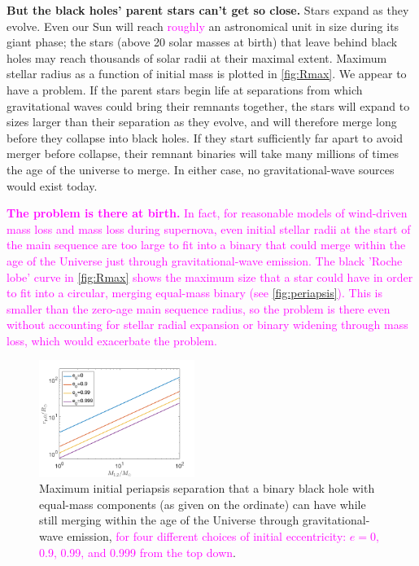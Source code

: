 \documentclass[iop,onecolumn]{revtex4}
\newcommand{\ilya}[1]{\textcolor{magenta}{#1}}
\begin{document}
\textbf{But the black holes' parent stars can't get so close.} Stars expand as they evolve. Even our Sun will reach \ilya{roughly} an astronomical unit in size during its giant phase; the stars (above 20 solar masses at birth) that leave behind black holes may reach thousands of solar radii at their maximal extent. Maximum stellar radius as a function of initial mass is plotted in \autoref{fig:Rmax}. We appear to have a problem. If the parent stars begin life at separations from which gravitational waves could bring their remnants together, the stars will expand to sizes larger than their separation as they evolve, and will therefore merge long before they collapse into black holes. If they start sufficiently far apart to avoid merger before collapse, their remnant binaries will take many millions of times the age of the universe to merge. In either case, no gravitational-wave sources would exist today. 

\ilya{\textbf{The problem is there at birth.} In fact, for reasonable models of wind-driven mass loss and mass loss during supernova, even initial stellar radii at the start of the main sequence are too large to fit into a binary that could merge within the age of the Universe just through gravitational-wave emission.  The black 'Roche lobe' curve in \autoref{fig:Rmax} shows the maximum size that a star could have in order to fit into a circular, merging equal-mass binary (see \autoref{fig:periapsis}).  This is smaller than the zero-age main sequence radius, so the problem is there even without accounting for stellar radial expansion or binary widening through mass loss, which would exacerbate the problem.}

 
\begin{figure}
	\centering
	\includegraphics[width=0.45\textwidth]{M-rp-log.png}
	\caption{Maximum initial periapsis separation that a binary black hole with equal-mass components (as given on the ordinate) can have while still merging within the age of the Universe through gravitational-wave emission, \ilya{for four different choices of initial eccentricity: $e=0$, 0.9, 0.99, and 0.999 from the top down}.\label{fig:periapsis}}
\end{figure}
	
\end{document}
